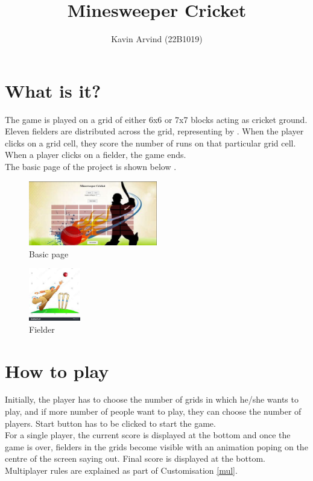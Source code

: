 \documentclass{article}
\begin{document}
\thispagestyle{empty}
\title{Minesweeper Cricket}
\author{Kavin Arvind (22B1019)}
\date{}
\maketitle

\tableofcontents
\clearpage

\section{What is it?}
The game is played on a grid of either 6x6 or 7x7 blocks acting as cricket 
ground. Eleven fielders are distributed across the grid, representing by \fig[\ref{fig:fielder}].
When the player clicks on a grid cell, they score the number of runs on that particular
grid cell. When a player clicks on a fielder, the game ends.\\
The basic page of the project is shown below \fig[\ref{fig:basic}].
\begin{figure}[h!]
    \centering
    \includegraphics[width=0.5\textwidth]{basic page.jpeg}
    \caption{Basic page}
    \label{fig:basic}
\end{figure}

\begin{figure}[h!]
    \centering
    \includegraphics[width=0.2\textwidth]{fielder.jpeg}
    \caption{Fielder}
    \label{fig:fielder}
\end{figure}

\section{How to play}
Initially, the player has to choose the number of grids in which he/she wants to play, and if more number of people want to play, they can choose the number of players. Start button has to be clicked to start the game.\\
For a single player, the current score is displayed at the bottom and once the game is over, fielders in the grids become visible with an animation poping on the centre of the screen saying out. Final score is displayed at the bottom.\\
Multiplayer rules are explained as part of Customisation \ref{mul}.
\end{document}
